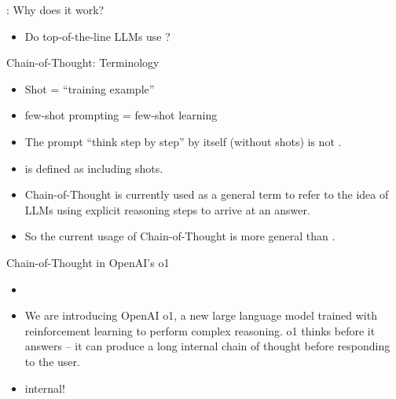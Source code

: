 \begin{frame}{\cotpfull: Why does it work?}

\vfill

\begin{itemize}
    \item \ques Do top-of-the-line LLMs use \cotpfull?
\end{itemize}

\vfill

\end{frame}

\begin{frame}{Chain-of-Thought: Terminology}

\vfill

\begin{itemize}
    \item Shot = ``training example''
    \item few-shot prompting = few-shot learning
    \item The prompt ``think step by step'' by itself
    (without shots) is not \cotpfull.
    \item \cotpfull is defined as including shots.
    \item Chain-of-Thought is currently used as a general
    term to refer to the idea of LLMs using explicit
    reasoning steps to arrive at an answer.
    \item So the current usage of Chain-of-Thought is more
    general than \cotpfull.
\end{itemize}

\vfill

\end{frame}
\begin{frame}{Chain-of-Thought in OpenAI's o1}

\vfill

\begin{itemize}
    \item {}
\item We are introducing OpenAI o1, a new large language
model trained with reinforcement learning to perform complex
reasoning. o1 thinks before it answers -- it can produce a long
internal chain of thought before responding to the user.
\item internal!
\end{itemize}

\vfill

\end{frame}


